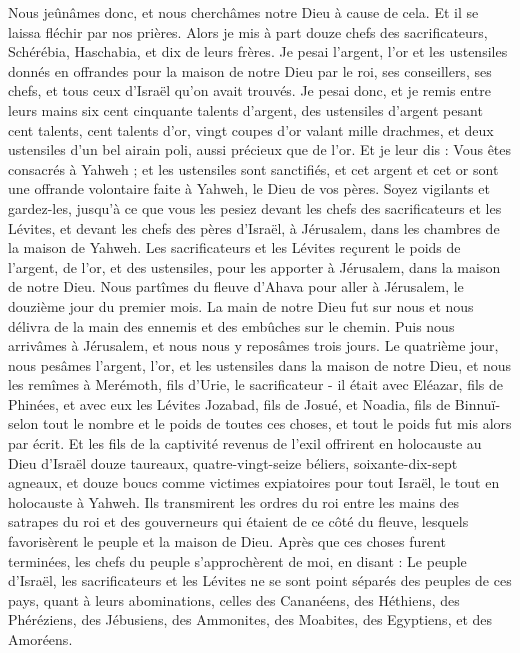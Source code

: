 \begin{multicols}{2}
Nous jeûnâmes donc, et nous cherchâmes notre Dieu à cause de cela. Et il se laissa fléchir par nos prières.
Alors je mis à part douze chefs des sacrificateurs, Schérébia, Haschabia, et dix de leurs frères.
Je pesai l'argent, l'or et les ustensiles donnés en offrandes pour la maison de notre Dieu par le roi, ses conseillers, ses chefs, et tous ceux d'Israël qu'on avait trouvés.
Je pesai donc, et je remis entre leurs mains six cent cinquante talents d'argent, des ustensiles d'argent pesant cent talents, cent talents d'or,
vingt coupes d'or valant mille drachmes, et deux ustensiles d’un bel airain poli, aussi précieux que de l'or.
Et je leur dis : Vous êtes consacrés à Yahweh ; et les ustensiles sont sanctifiés, et cet argent et cet or sont une offrande volontaire faite à Yahweh, le Dieu de vos pères.
Soyez vigilants et gardez-les, jusqu'à ce que vous les pesiez devant les chefs des sacrificateurs et les Lévites, et devant les chefs des pères d'Israël, à Jérusalem, dans les chambres de la maison de Yahweh.
Les sacrificateurs et les Lévites reçurent le poids de l'argent, de l'or, et des ustensiles, pour les apporter à Jérusalem, dans la maison de notre Dieu.
Nous partîmes du fleuve d'Ahava pour aller à Jérusalem, le douzième jour du premier mois. La main de notre Dieu fut sur nous et nous délivra de la main des ennemis et des  embûches sur le chemin.
Puis nous arrivâmes à Jérusalem, et nous nous y reposâmes trois jours.
Le quatrième jour, nous pesâmes l'argent, l'or, et les ustensiles dans la maison de notre Dieu, et nous les remîmes à Merémoth, fils d'Urie, le sacrificateur - il était avec Eléazar, fils de Phinées, et avec eux les Lévites Jozabad, fils de Josué, et Noadia, fils de Binnuï-
 selon tout le nombre et le poids de toutes ces choses, et tout le poids fut mis alors par écrit.
Et les fils de la captivité revenus de l’exil offrirent en holocauste au Dieu d'Israël douze taureaux, quatre-vingt-seize béliers, soixante-dix-sept agneaux, et douze boucs comme victimes expiatoires pour tout Israël, le tout en holocauste à Yahweh.
Ils transmirent les ordres du roi entre les mains des satrapes du roi et des gouverneurs qui étaient de ce côté du fleuve, lesquels favorisèrent le peuple et la maison de Dieu.
\TextTitle{[La désobéissance]}
\VerseOne{}Après que ces choses furent terminées, les chefs du peuple s'approchèrent de moi, en disant : Le peuple d'Israël,  les sacrificateurs et les Lévites ne se sont point séparés des peuples de ces pays, quant à leurs abominations, celles des Cananéens, des Héthiens, des Phéréziens, des Jébusiens, des Ammonites, des Moabites, des Egyptiens, et des Amoréens.

\end{multicols}
